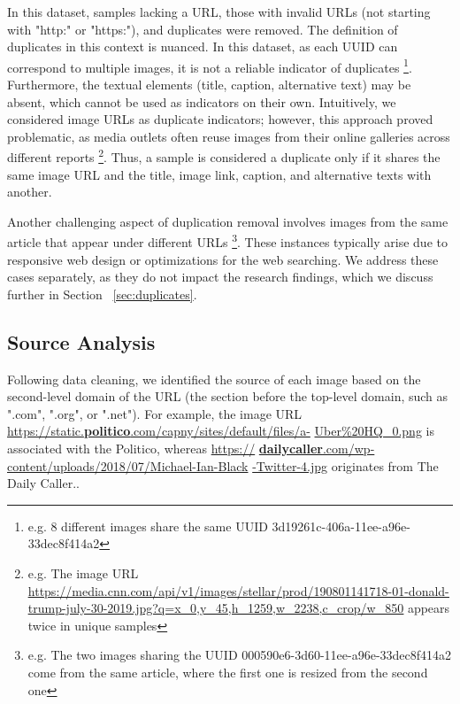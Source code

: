 \documentclass[sigconf]{acmart}
\begin{document}
In this dataset, samples lacking a URL, those with invalid URLs (not starting with "http:" or "https:"), and duplicates were removed. The definition of duplicates in this context is nuanced. In this dataset, as each UUID can correspond to multiple images, it is not a reliable indicator of duplicates \footnote{e.g. 8 different images share the same UUID 3d19261c-406a-11ee-a96e-33dec8f414a2}. Furthermore, the textual elements (title, caption, alternative text) may be absent, which cannot be used as indicators on their own. Intuitively, we considered image URLs as duplicate indicators; however, this approach proved problematic, as media outlets often reuse images from their online galleries across different reports \footnote{e.g. The image URL \href{https://media.cnn.com/api/v1/images/stellar/prod/190801141718-01-donald-trump-july-30-2019.jpg?q=x_0,y_45,h_1259,w_2238,c_crop/w_850}{\underline{https://media.cnn.com/api/v1/images/stellar/prod/190801141718}\newline \underline{-01-donald-trump-july-30-2019.jpg?q=x\_0,y\_45,h\_1259,w\_2238,c\_crop/w\_850}} \newline appears twice in unique samples}. Thus, a sample is considered a duplicate only if it shares the same image URL and the title, image link, caption, and alternative texts with another.



Another challenging aspect of duplication removal involves images from the same article that appear under different URLs \footnote{e.g. The two images sharing the UUID 000590e6-3d60-11ee-a96e-33dec8f414a2 come from the same article, where the first one is resized from the second one}. These instances typically arise due to responsive web design or optimizations for the web searching. We address these cases separately, as they do not impact the research findings, which we discuss further in Section ~\ref{sec:duplicates}.

\subsection{Source Analysis}
Following data cleaning, we identified the source of each image based on the second-level domain of the URL (the section before the top-level domain, such as ".com", ".org", or ".net"). For example, the image URL \underline{https://static.\textbf{politico}.com/capny/sites/default/files/a-} \underline{Uber\%20HQ\_0.png} is associated with the Politico, whereas \underline{https://} \underline{\textbf{dailycaller}.com/wp-content/uploads/2018/07/Michael-Ian-Black} \newline \underline{-Twitter-4.jpg} originates from The Daily Caller.. 
\end{document}
